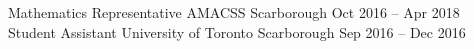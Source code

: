 \begin{cvhonors}
  \cvhonor
    {Mathematics Representative}
    {AMACSS}
    {Scarborough}
    {Oct 2016 -- Apr 2018}
  \cvhonor
    {Student Assistant}
    {University of Toronto}
    {Scarborough}
    {Sep 2016 -- Dec 2016}
\end{cvhonors}